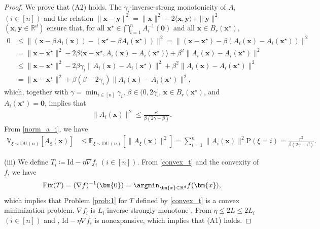 \documentclass[smallextended,referee,envcountsect,]{svjour3}
\begin{document}
\begin{proof}
We prove that (A2) holds. The $\gamma_i$-inverse-strong monotonicity of $A_i$ $(i\in [n])$ and the relation $\|\bm{x} - \bm{y} \|^2 = \|\bm{x}\|^2 -2 \langle \bm{x},\bm{y} \rangle + \| \bm{y} \|^2$ $(\bm{x},\bm{y} \in \mathbb{R}^d)$ ensure that, for all $\bm{x}^\star \in \bigcap_{i=1}^n A_i^{-1}(\bm{0})$ and all $\bm{x} \in B_{r}(\bm{x}^\star)$, 
\begin{align*}
0 
&\leq 
\|( \bm{x} - \beta A_i (\bm{x})) - ( \bm{x}^\star - \beta A_i (\bm{x}^\star))\|^2
= 
\| (\bm{x} - \bm{x}^\star) - \beta (A_i (\bm{x}) - A_i (\bm{x}^\star)) \|^2\\
&= 
\| \bm{x} - \bm{x}^\star \|^2 - 2 \beta \langle \bm{x} - \bm{x}^\star, A_i (\bm{x}) - A_i (\bm{x}^\star) \rangle 
+ \beta^2 \|A_i (\bm{x}) - A_i (\bm{x}^\star)\|^2\\
&\leq
\| \bm{x} - \bm{x}^\star \|^2 - 2 \beta \gamma_i \| A_i (\bm{x}) - A_i (\bm{x}^\star) \|^2 
+ \beta^2 \|A_i (\bm{x}) - A_i (\bm{x}^\star)\|^2\\
&= 
\| \bm{x} - \bm{x}^\star \|^2 + \beta (\beta - 2 \gamma_i)\|A_i (\bm{x}) - A_i (\bm{x}^\star)\|^2,
\end{align*}
which, together with $\gamma = \min_{i \in [n]} \gamma_i$, $\beta \in (0,2 \gamma]$, $\bm{x} \in B_r (\bm{x}^\star)$, and $A_i (\bm{x}^\star) = \bm{0}$, implies that 
\begin{align}\label{norm_a_i}
\|A_i (\bm{x})\|^2 \leq \frac{r^2}{\beta (2 \gamma - \beta)}.
\end{align}
From \eqref{norm_a_i}, we have 
\begin{align*}
\mathbb{V}_{\xi \sim \mathrm{DU}(n)}[A_\xi (\bm{x})]
&\leq 
\mathbb{E}_{\xi \sim \mathrm{DU}(n)} \left[\| A_\xi (\bm{x})\|^2 \right] 
= 
\sum_{i=1}^n \|A_i (\bm{x})\|^2 \mathrm{P}(\xi = i)
=
\frac{r^2}{\beta (2 \gamma - \beta)}.
\end{align*} 

(iii) We define $T_i \coloneqq \mathrm{Id} - \eta \nabla f_i$ $(i\in [n])$. From \eqref{convex_t} and the convexity of $f$, we have 
\begin{align*}
\mathrm{Fix}(T) = (\nabla f)^{-1} (\bm{0}) = \argmin_{\bm{x} \in \mathbb{R}^d} f(\bm{x}),
\end{align*}
which implies that Problem \ref{prob:1} for $T$ defined by \eqref{convex_t} is a convex minimization problem. $\nabla f_i$ is $L_i$-inverse-strongly monotone \cite[Th\'{e}or\`{e}me 5]{baillon1977}. From $\eta \leq 2 L \leq 2 L_i$ $(i\in [n])$ and \cite[Proposition 2.3]{iiduka_JOTA}, $\mathrm{Id} - \eta \nabla f_i$ is nonexpansive, which implies that (A1) holds.


\end{proof}
\end{document}
